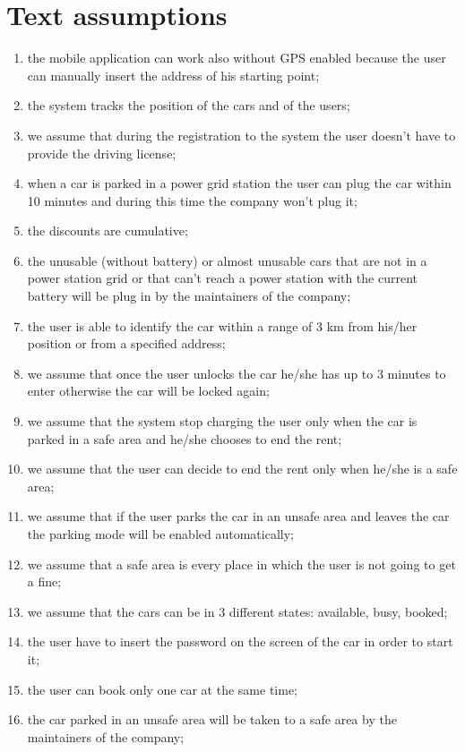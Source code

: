 \section{Text assumptions}
\begin{enumerate}
	\item the mobile application can work also without GPS enabled because the user can manually insert the address of his starting point;
	\item the system tracks the position of the cars and of the users;
	\item we assume that during the registration to the system the user doesn't have to provide the driving license;
	\item when a car is parked in a power grid station the user can plug the car within 10 minutes and during this time the company won't plug it;
	\item the discounts are cumulative;
	\item the unusable (without battery) or almost unusable cars that are not in a power station grid or that can't reach a power station with the current battery will be plug in by the maintainers of the company;
	\item the user is able to identify the car within a range of 3 km from his/her position or from a specified address;
	\item we assume that once the user unlocks the car he/she has up to 3 minutes to enter otherwise the car will be locked again;
	\item we assume that the system stop charging the user only when the car is parked in a safe area and he/she chooses to end the rent;
	\item we assume that the user can decide to end the rent only when he/she is a safe area;
	\item we assume that if the user parks the car in an unsafe area and leaves the car the parking mode will be enabled automatically;
	\item we assume that a safe area is every  place in which the user is not going to get a fine;
	\item we assume that the cars can be in 3 different states: available, busy, booked;
	\item the user have to insert the password on the screen of the car in order to start it;
	\item the user can book only one car at the same time;
	\item the car parked in an unsafe area will be taken to a safe area by the maintainers of the company;

\end{enumerate}
